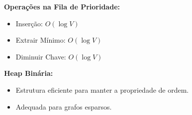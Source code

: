 \documentclass[preview]{standalone}
\begin{document}
\begin{center}
\textbf{Operações na Fila de Prioridade:}
            \begin{itemize}
                \item Inserção: $O(\log V)$
                \item Extrair Mínimo: $O(\log V)$
                \item Diminuir Chave: $O(\log V)$
            \end{itemize}
            
            \textbf{Heap Binária:} 
            \begin{itemize}
                \item Estrutura eficiente para manter a propriedade de ordem.
                \item Adequada para grafos esparsos.
            \end{itemize}
\end{center}
\end{document}
